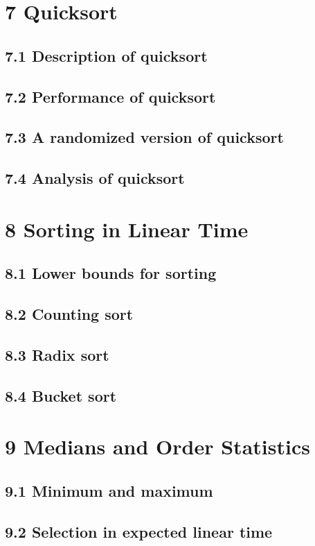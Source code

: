 \documentclass[a4paper]{article}
\begin{document}
\newpage
\section{7 Quicksort}
\subsection{7.1 Description of quicksort}
\subsection{7.2 Performance of quicksort}
\subsection{7.3 A randomized version of quicksort}
\subsection{7.4 Analysis of quicksort}

\newpage
\section{8 Sorting in Linear Time}
\subsection{8.1 Lower bounds for sorting}
\subsection{8.2 Counting sort}
\subsection{8.3 Radix sort}
\subsection{8.4 Bucket sort}

\newpage
\section{9 Medians and Order Statistics}
\subsection{9.1 Minimum and maximum}
\subsection{9.2 Selection in expected linear time}
\end{document}

